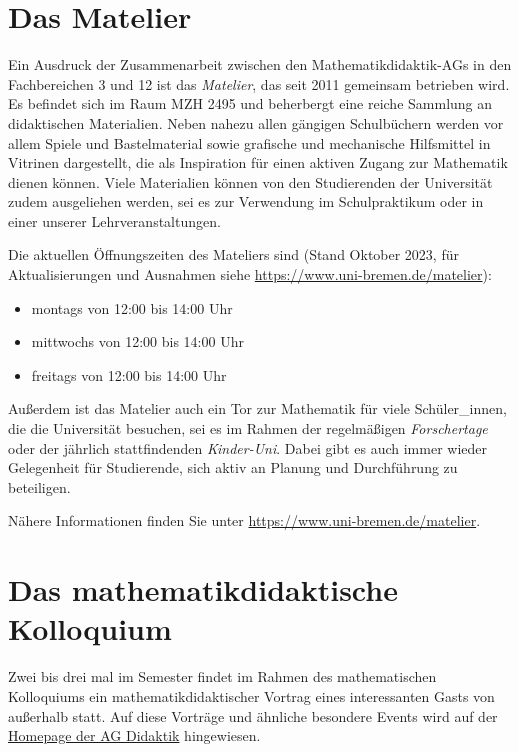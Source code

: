 \documentclass[
  bibliography=totoc,
  oneside,
  12pt,
  a4paper]{scrbook}
\begin{document}
\hypertarget{das-matelier}{%
\section{Das Matelier}\label{das-matelier}}

Ein Ausdruck der Zusammenarbeit zwischen den Mathematikdidaktik-AGs in den Fachbereichen 3 und 12 ist das \emph{Matelier}, das seit 2011 gemeinsam betrieben wird. Es befindet sich im Raum MZH 2495 und beherbergt eine reiche Sammlung an didaktischen Materialien. Neben nahezu allen gängigen Schulbüchern werden vor allem Spiele und Bastelmaterial sowie grafische und mechanische Hilfsmittel in Vitrinen dargestellt, die als Inspiration für einen aktiven Zugang zur Mathematik dienen können. Viele Materialien können von den Studierenden der Universität zudem ausgeliehen werden, sei es zur Verwendung im Schulpraktikum oder in einer unserer Lehrveranstaltungen.

Die aktuellen Öffnungszeiten des Mateliers sind (Stand Oktober 2023, für Aktualisierungen und Ausnahmen siehe \url{https://www.uni-bremen.de/matelier}):

\begin{itemize}
\item
  montags von 12:00 bis 14:00 Uhr
\item
  mittwochs von 12:00 bis 14:00 Uhr
\item
  freitags von 12:00 bis 14:00 Uhr
\end{itemize}

Außerdem ist das Matelier auch ein Tor zur Mathematik für viele Schüler\_innen, die die Universität besuchen, sei es im Rahmen der regelmäßigen \emph{Forschertage} oder der jährlich stattfindenden \emph{Kinder-Uni}. Dabei gibt es auch immer wieder Gelegenheit für Studierende, sich aktiv an Planung und Durchführung zu beteiligen.

Nähere Informationen finden Sie unter \url{https://www.uni-bremen.de/matelier}.

\hypertarget{das-mathematikdidaktische-kolloquium}{%
\section{Das mathematikdidaktische Kolloquium}\label{das-mathematikdidaktische-kolloquium}}

Zwei bis drei mal im Semester findet im Rahmen des mathematischen Kolloquiums ein mathematikdidaktischer Vortrag eines interessanten Gasts von außerhalb statt. Auf diese Vorträge und ähnliche besondere Events wird auf der \href{http://www.math.uni-bremen.de/didaktik/}{Homepage der AG Didaktik} hingewiesen.
\end{document}
